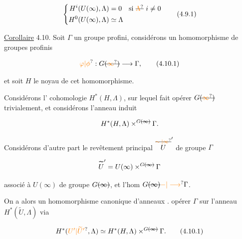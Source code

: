 \[
\left\{\begin{aligned}
H^i(U(\infty),\Lambda)&=0\quad\text{si }\deleted{\unsure{\Lambda}}\ i\ne0\\
H^0(U(\infty),\Lambda)&\simeq\Lambda
\end{aligned}\right.
\tag*{(4.9.1)}
\]



\uline{Corollaire} 4.10.  Soit $\Gamma$ un groupe profini, considérons un homomorphisme de groupes profinis

\[
\unsure{\varphi|\phi}:G\deleted{(\unsure{\infty})}\longrightarrow\Gamma,
\tag*{(4.10.1)}
\]

et soit $H$ le noyau de cet homomorphisme.


 Considérons l' cohomologie $H^*(H,\Lambda)$, sur lequel  fait opérer $G\deleted{(\unsure{\infty})}$ trivialement, et considérons l'anneau induit

\[
H^*(H,\Lambda)\mathbin{\times^{G\deleted{(\infty)}}}\Gamma.
\]

 Considérons d'autre part le revêtement principal $\overset{\deleted{\unsure{\sim|\infty}}}{U}'$ de groupe $\Gamma$

\[
\overset{\deleted{\sim}}{U}'=U(\infty)\mathbin{\times^{G\deleted{(\infty)}}}\Gamma
\]

associé à $U(\infty)$ de groupe $G\deleted{(\infty)}$, et l'hom $G\deleted{(\infty)}\unsure{{-}|\longrightarrow}\Gamma$.

On a alors un homomorphisme canonique d'anneaux .  opérer $\Gamma$ sur l'anneau $H^*(\widetilde U,\Lambda)$ via 

\[
H^*(\unsure{U'|\widetilde U'},\Lambda)\simeq H^*(H,\Lambda)\mathbin{\times^{G\deleted{(\infty)}}}\Gamma.
\tag*{(4.10.1)}
\]

